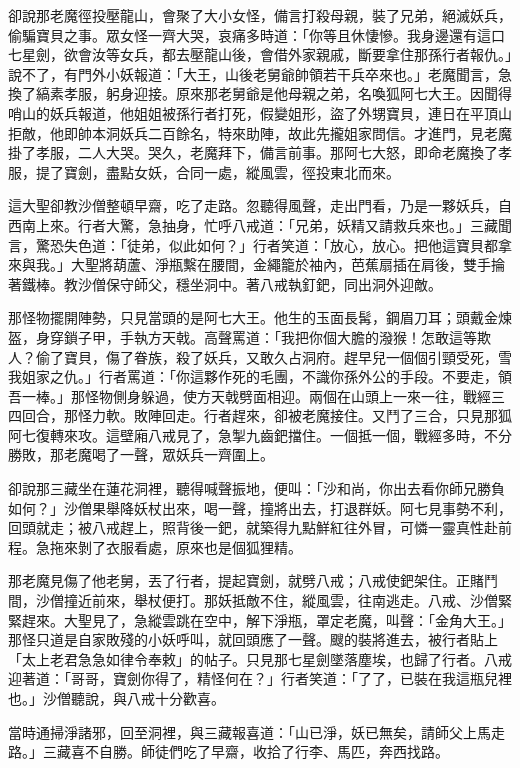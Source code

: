 卻說那老魔徑投壓龍山，會聚了大小女怪，備言打殺母親，裝了兄弟，絕滅妖兵，偷騙寶貝之事。眾女怪一齊大哭，哀痛多時道：「你等且休悽慘。我身邊還有這口七星劍，欲會汝等女兵，都去壓龍山後，會借外家親戚，斷要拿住那孫行者報仇。」說不了，有門外小妖報道：「大王，山後老舅爺帥領若干兵卒來也。」老魔聞言，急換了縞素孝服，躬身迎接。原來那老舅爺是他母親之弟，名喚狐阿七大王。因聞得哨山的妖兵報道，他姐姐被孫行者打死，假變姐形，盜了外甥寶貝，連日在平頂山拒敵，他即帥本洞妖兵二百餘名，特來助陣，故此先攏姐家問信。才進門，見老魔掛了孝服，二人大哭。哭久，老魔拜下，備言前事。那阿七大怒，即命老魔換了孝服，提了寶劍，盡點女妖，合同一處，縱風雲，徑投東北而來。

這大聖卻教沙僧整頓早齋，吃了走路。忽聽得風聲，走出門看，乃是一夥妖兵，自西南上來。行者大驚，急抽身，忙呼八戒道：「兄弟，妖精又請救兵來也。」三藏聞言，驚恐失色道：「徒弟，似此如何？」行者笑道：「放心，放心。把他這寶貝都拿來與我。」大聖將葫蘆、淨瓶繫在腰間，金繩籠於袖內，芭蕉扇插在肩後，雙手掄著鐵棒。教沙僧保守師父，穩坐洞中。著八戒執釘鈀，同出洞外迎敵。

那怪物擺開陣勢，只見當頭的是阿七大王。他生的玉面長髯，鋼眉刀耳；頭戴金煉盔，身穿鎖子甲，手執方天戟。高聲罵道：「我把你個大膽的潑猴！怎敢這等欺人？偷了寶貝，傷了眷族，殺了妖兵，又敢久占洞府。趕早兒一個個引頸受死，雪我姐家之仇。」行者罵道：「你這夥作死的毛團，不識你孫外公的手段。不要走，領吾一棒。」那怪物側身躲過，使方天戟劈面相迎。兩個在山頭上一來一往，戰經三四回合，那怪力軟。敗陣回走。行者趕來，卻被老魔接住。又鬥了三合，只見那狐阿七復轉來攻。這壁廂八戒見了，急掣九齒鈀擋住。一個抵一個，戰經多時，不分勝敗，那老魔喝了一聲，眾妖兵一齊圍上。

卻說那三藏坐在蓮花洞裡，聽得喊聲振地，便叫：「沙和尚，你出去看你師兄勝負如何？」沙僧果舉降妖杖出來，喝一聲，撞將出去，打退群妖。阿七見事勢不利，回頭就走；被八戒趕上，照背後一鈀，就築得九點鮮紅往外冒，可憐一靈真性赴前程。急拖來剝了衣服看處，原來也是個狐狸精。

那老魔見傷了他老舅，丟了行者，提起寶劍，就劈八戒；八戒使鈀架住。正賭鬥間，沙僧撞近前來，舉杖便打。那妖抵敵不住，縱風雲，往南逃走。八戒、沙僧緊緊趕來。大聖見了，急縱雲跳在空中，解下淨瓶，罩定老魔，叫聲：「金角大王。」那怪只道是自家敗殘的小妖呼叫，就回頭應了一聲。颼的裝將進去，被行者貼上「太上老君急急如律令奉敕」的帖子。只見那七星劍墜落塵埃，也歸了行者。八戒迎著道：「哥哥，寶劍你得了，精怪何在？」行者笑道：「了了，已裝在我這瓶兒裡也。」沙僧聽說，與八戒十分歡喜。

當時通掃淨諸邪，回至洞裡，與三藏報喜道：「山已淨，妖已無矣，請師父上馬走路。」三藏喜不自勝。師徒們吃了早齋，收拾了行李、馬匹，奔西找路。

